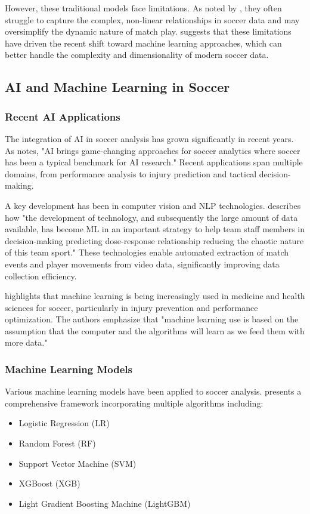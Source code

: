 \documentclass[10pt,journal,compsoc]{IEEEtran}
\begin{document}
However, these traditional models face limitations. As noted by \cite{rico2023machine}, they often struggle to capture the complex, non-linear relationships in soccer data and may oversimplify the dynamic nature of match play. \cite{pu2024orientation} suggests that these limitations have driven the recent shift toward machine learning approaches, which can better handle the complexity and dimensionality of modern soccer data.

\subsection{AI and Machine Learning in Soccer}

\subsubsection{Recent AI Applications}
The integration of AI in soccer analysis has grown significantly in recent years. As \cite{pu2024orientation} notes, "AI brings game-changing approaches for soccer analytics where soccer has been a typical benchmark for AI research." Recent applications span multiple domains, from performance analysis to injury prediction and tactical decision-making.

A key development has been in computer vision and NLP technologies. \cite{rico2023machine} describes how "the development of technology, and subsequently the large amount of data available, has become ML in an important strategy to help team staff members in decision-making predicting dose-response relationship reducing the chaotic nature of this team sport." These technologies enable automated extraction of match events and player movements from video data, significantly improving data collection efficiency.

\cite{nassis2023review} highlights that machine learning is being increasingly used in medicine and health sciences for soccer, particularly in injury prevention and performance optimization. The authors emphasize that "machine learning use is based on the assumption that the computer and the algorithms will learn as we feed them with more data."

\subsubsection{Machine Learning Models}
Various machine learning models have been applied to soccer analysis. \cite{wong2025predictive} presents a comprehensive framework incorporating multiple algorithms including:
\begin{itemize}
    \item Logistic Regression (LR)
    \item Random Forest (RF)
    \item Support Vector Machine (SVM)
    \item XGBoost (XGB)
    \item Light Gradient Boosting Machine (LightGBM)
\end{itemize}
\end{document}
